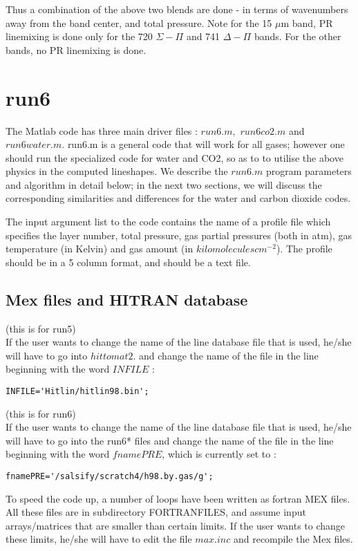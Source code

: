 \documentclass[11pt]{article}
\begin{document}
Thus a combination of the above two blends are done - in terms of 
wavenumbers away from the band center, and total pressure. 
Note for the 15 $\mu$m band, PR linemixing is done only for the 720 
$\Sigma-\Pi$ and 741 $\Delta-\Pi$ bands. For the other bands, no PR linemixing
is done.

\newpage
\section{run6}

The Matlab code has three main driver files : $run6.m,$ $run6co2.m$ and 
$run6water.m.$ run6.m is a general code that will work for all gases; 
however 
one should run the specialized code for water and CO2, so as to to utilise 
the above physics in the computed lineshapes. We describe the $run6.m$ 
program parameters and algorithm in detail below; in the next two sections, 
we will discuss the corresponding similarities and differences for the 
water and carbon dioxide codes.

The input argument list to the code contains the name of a profile file 
which specifies the layer number, total pressure, gas partial 
pressures (both in atm), gas temperature (in Kelvin) and gas amount 
(in $kilomolecules cm^{-2}$). The profile should be in a 5 column format, 
and should be a text file.

\subsection{Mex files and HITRAN database}
(this is for run5) \\
If the user wants to change the name of the line database file that is used,
he/she will have to go into $hittomat2.$ and change the name of the file in
the line beginning with the word $INFILE$ :
\begin{verbatim}
INFILE='Hitlin/hitlin98.bin';
\end{verbatim}

(this is for run6) \\
If the user wants to change the name of the line database file that is used,
he/she will have to go into the run6* files and change the name of the 
file in the line beginning with the word $fnamePRE$, which is currently 
set to :
\begin{verbatim}
fnamePRE='/salsify/scratch4/h98.by.gas/g';
\end{verbatim}

To speed the code up, a number of loops have been written as fortran MEX 
files.
All these files are in subdirectory FORTRANFILES, and assume input 
arrays/matrices that are smaller than certain limits. If the user wants to 
change these limits, he/she will have to edit the file $max.inc$ and 
recompile the Mex files.
\end{document}
